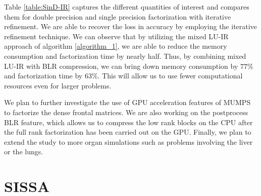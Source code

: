 \documentclass[a4paper,12pt]{article}
\begin{document}
Table \ref{table:SinD-IR} captures the different quantities of interest and compares them for double precision and single precision factorization with iterative refinement.
We are able to recover the loss in accuracy by employing the iterative refinement technique. We can observe that by utilizing the mixed LU-IR approach of algorithm \ref{algorithm_1}, we are able to reduce the memory consumption and factorization time by nearly half. Thus, by combining mixed LU-IR with BLR compression, we can bring down memory consumption by $77\%$ and factorization time by $63\%$. This will allow us to use fewer computational resources even for larger problems.

We plan to further investigate the use of GPU acceleration features of MUMPS to factorize the dense frontal matrices. We are also working on the postprocess BLR feature, which allows us to compress the low rank blocks on the CPU after the full rank factorization has been carried out on the GPU. Finally, we plan to extend the study to more organ simulations such as problems involving the liver or the lungs.

\newpage

\section{SISSA}
\label{sec:section4}


\end{document}
